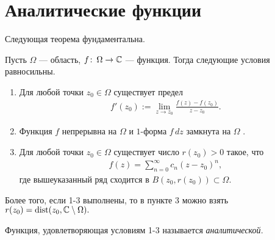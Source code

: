 \documentclass[../complex-analysis.tex]{subfiles}
\begin{document}
\section{Аналитические функции}

Следующая теорема фундаментальна.

\begin{thm}
\label{theorem:cauchy-gursa-morer}
 Пусть $\Omega$  --- область, $f\colon\,\Omega \to \mathbb{C}$  --- функция. Тогда следующие условия равносильны.
 \begin{enumerate}
  \item \label{enum1:theorem:cauchy_gurs_morer} Для любой точки $z_0 \in \Omega$ существует предел
   \begin{align*}
    f'(z_0) := \lim_{z \to z_0} \frac{f(z) - f(z_0)}{z-z_0}.
   \end{align*} 
  \item Функция $f$ непрерывна на $\Omega$ и $1$-форма $f\,dz$  замкнута на $\Omega$ .
  \item Для любой точки $ z_0 \in \Omega$ существует число $r(z_0) > 0$ такое, что
    \begin{align*}
    f(z) = \sum_{n=0}^{\infty} c_n(z-z_0)^{n},
   \end{align*} где вышеуказанный ряд сходится в $B(z_0, r(z_0)) \subset \Omega$.
 \end{enumerate}
 Более того,  если 1-3 выполнены, то в пункте 3 можно взять $r(z_0) = \mathrm{dist}(z_0, \mathbb{C} \setminus \Omega).$
\end{thm}
\begin{df}
 Функция, удовлетворяющая условиям 1-3 называется \textit{аналитической}.
\end{df}
\end{document}
